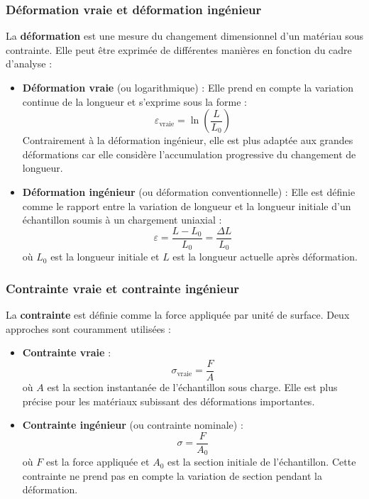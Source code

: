\documentclass[12pt,a4paper]{article}
\begin{document}
\subsubsection{Déformation vraie et déformation ingénieur}
La \textbf{déformation} est une mesure du changement dimensionnel d’un matériau sous contrainte. Elle peut être exprimée de différentes manières en fonction du cadre d’analyse :

\begin{itemize}
    \item \textbf{Déformation vraie} (ou logarithmique) :  
    Elle prend en compte la variation continue de la longueur et s’exprime sous la forme :
    \begin{equation}
        \varepsilon_{\text{vraie}} = \ln \left( \frac{L}{L_0} \right)
    \end{equation}
    Contrairement à la déformation ingénieur, elle est plus adaptée aux grandes déformations car elle considère l’accumulation progressive du changement de longueur.

    \item \textbf{Déformation ingénieur} (ou déformation conventionnelle) :  
    Elle est définie comme le rapport entre la variation de longueur et la longueur initiale d’un échantillon soumis à un chargement uniaxial :
    \begin{equation}
        \varepsilon = \frac{L - L_0}{L_0} = \frac{\Delta L}{L_0}
    \end{equation}
    où \(L_0\) est la longueur initiale et \(L\) est la longueur actuelle après déformation.
\end{itemize}

\subsubsection{Contrainte vraie et contrainte ingénieur}
La \textbf{contrainte} est définie comme la force appliquée par unité de surface. Deux approches sont couramment utilisées :

\begin{itemize}
    \item \textbf{Contrainte vraie} :
    \begin{equation}
        \sigma_{\text{vraie}} = \frac{F}{A}
    \end{equation}
    où \(A\) est la section instantanée de l’échantillon sous charge. Elle est plus précise pour les matériaux subissant des déformations importantes.

    \item \textbf{Contrainte ingénieur} (ou contrainte nominale) :
    \begin{equation}
        \sigma = \frac{F}{A_0}
    \end{equation}
    où \(F\) est la force appliquée et \(A_0\) est la section initiale de l’échantillon. Cette contrainte ne prend pas en compte la variation de section pendant la déformation.
\end{itemize}
\end{document}
